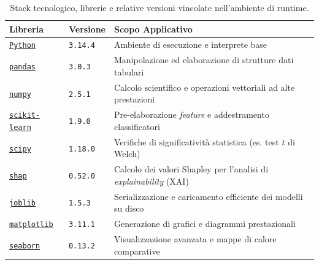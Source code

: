 \begin{table}[H]
    \centering
    \small
    \caption{Stack tecnologico, librerie e relative versioni vincolate nell'ambiente di runtime.}
    \label{tab:stack_tecnologico}
    \begin{tabular}{l l l}
        \toprule
        \textbf{Libreria} & \textbf{Versione} & \textbf{Scopo Applicativo} \\
        \midrule
        \href{https://www.python.org/}{\texttt{Python}} 
        & \texttt{3.14.4} 
        & Ambiente di esecuzione e interprete base \\

        \href{https://pandas.pydata.org/}{\texttt{pandas}} 
        & \texttt{3.0.3} 
        & Manipolazione ed elaborazione di strutture dati tabulari \\

        \href{https://numpy.org/}{\texttt{numpy}} 
        & \texttt{2.5.1} 
        & Calcolo scientifico e operazioni vettoriali ad alte prestazioni \\

        \href{https://scikit-learn.org/}{\texttt{scikit-learn}} 
        & \texttt{1.9.0} 
        & Pre-elaborazione \textit{feature} e addestramento classificatori \\

        \href{https://scipy.org/}{\texttt{scipy}} 
        & \texttt{1.18.0} 
        & Verifiche di significatività statistica (es. test $t$ di Welch) \\

        \href{https://github.com/slundberg/shap}{\texttt{shap}} 
        & \texttt{0.52.0} 
        & Calcolo dei valori Shapley per l'analisi di \textit{explainability} (XAI) \\

        \href{https://joblib.readthedocs.io/}{\texttt{joblib}} 
        & \texttt{1.5.3} 
        & Serializzazione e caricamento efficiente dei modelli su disco \\

        \href{https://matplotlib.org/}{\texttt{matplotlib}} 
        & \texttt{3.11.1} 
        & Generazione di grafici e diagrammi prestazionali \\

        \href{https://seaborn.pydata.org/}{\texttt{seaborn}} 
        & \texttt{0.13.2} 
        & Visualizzazione avanzata e mappe di calore comparative \\
        \bottomrule
    \end{tabular}
\end{table}

